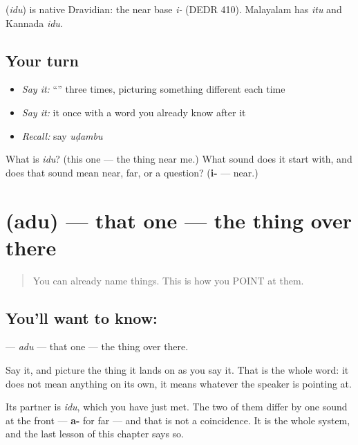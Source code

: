 \begin{cousinweb}
\textbf{} (\emph{idu}) is native Dravidian: the near base \emph{i-} (DEDR 410). Malayalam has \emph{itu} and Kannada \emph{idu}.
\end{cousinweb}

\subsection*{Your turn}
\begin{itemize}
\raggedright
  \item \emph{Say it:} \textquotedblleft{}\textquotedblright{} three times, picturing something different each time
  \item \emph{Say it:} it once with a word you already know after it
  \item \emph{Recall:} say \emph{uḍambu}
\end{itemize}

\begin{tcolorbox}[breakable,colback=teal!4,colframe=teal!35!black,title={Before you move on}]
What is \emph{idu}? (this one — the thing near me.) What sound does it start with, and does that sound mean near, far, or a question? (\textbf{i-} — near.)
\end{tcolorbox}
\section[\texorpdfstring{\ta{அது} (adu)}{அது (adu)}]{ (adu) — that one — the thing over there}

\label{lesson:TA-C40-that}



\begin{quote}
You can already name things. This is how you POINT at them.
\end{quote}

\subsection*{You'll want to know: }
\textbf{} — \emph{adu} — that one — the thing over there.

Say it, and picture the thing it lands on as you say it. That is the whole word: it does not mean anything on its own, it means whatever the speaker is pointing at.

Its partner is \textbf{} \emph{idu}, which you have just met. The two of them differ by one sound at the front — \textbf{a-} for far — and that is not a coincidence. It is the whole system, and the last lesson of this chapter says so.

